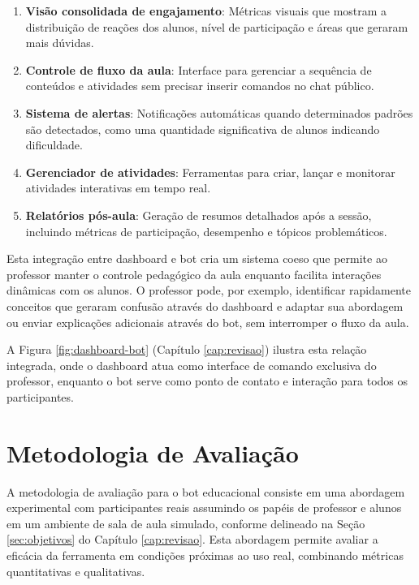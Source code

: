 \begin{enumerate}
\item \textbf{Visão consolidada de engajamento}: Métricas visuais que mostram a distribuição de reações dos alunos, nível de participação e áreas que geraram mais dúvidas.
\item \textbf{Controle de fluxo da aula}: Interface para gerenciar a sequência de conteúdos e atividades sem precisar inserir comandos no chat público.
\item \textbf{Sistema de alertas}: Notificações automáticas quando determinados padrões são detectados, como uma quantidade significativa de alunos indicando dificuldade.
\item \textbf{Gerenciador de atividades}: Ferramentas para criar, lançar e monitorar atividades interativas em tempo real.
\item \textbf{Relatórios pós-aula}: Geração de resumos detalhados após a sessão, incluindo métricas de participação, desempenho e tópicos problemáticos.
\end{enumerate}

Esta integração entre dashboard e bot cria um sistema coeso que permite ao professor manter o controle pedagógico da aula enquanto facilita interações dinâmicas com os alunos. O professor pode, por exemplo, identificar rapidamente conceitos que geraram confusão através do dashboard e adaptar sua abordagem ou enviar explicações adicionais através do bot, sem interromper o fluxo da aula.

A Figura \ref{fig:dashboard-bot} (Capítulo \ref{cap:revisao}) ilustra esta relação integrada, onde o dashboard atua como interface de comando exclusiva do professor, enquanto o bot serve como ponto de contato e interação para todos os participantes.


\section{Metodologia de Avaliação}
\label{sec:metodologia}

A metodologia de avaliação para o bot educacional consiste em uma abordagem experimental com participantes reais assumindo os papéis de professor e alunos em um ambiente de sala de aula simulado, conforme delineado na Seção \ref{sec:objetivos} do Capítulo \ref{cap:revisao}. Esta abordagem permite avaliar a eficácia da ferramenta em condições próximas ao uso real, combinando métricas quantitativas e qualitativas.

